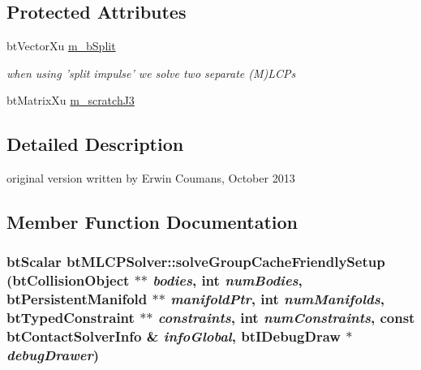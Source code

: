\subsection*{Protected Attributes}
\begin{CompactItemize}
\item 
\hypertarget{classbt_m_l_c_p_solver_9c1feb6855fa296c8ca582842f8e4fe3}{
btVectorXu \hyperlink{classbt_m_l_c_p_solver_9c1feb6855fa296c8ca582842f8e4fe3}{m\_\-bSplit}}
\label{classbt_m_l_c_p_solver_9c1feb6855fa296c8ca582842f8e4fe3}

\begin{CompactList}\small\item\em when using 'split impulse' we solve two separate (M)LCPs \item\end{CompactList}\item 
btMatrixXu \hyperlink{classbt_m_l_c_p_solver_8430698267e9572498e04e8dba3cda3b}{m\_\-scratchJ3}
\end{CompactItemize}


\subsection{Detailed Description}
original version written by Erwin Coumans, October 2013 

\subsection{Member Function Documentation}
\hypertarget{classbt_m_l_c_p_solver_a465e167537eceb89f7125d3bb2d5321}{
\subsubsection[solveGroupCacheFriendlySetup]{\setlength{\rightskip}{0pt plus 5cm}btScalar btMLCPSolver::solveGroupCacheFriendlySetup (btCollisionObject $\ast$$\ast$ {\em bodies}, \/  int {\em numBodies}, \/  btPersistentManifold $\ast$$\ast$ {\em manifoldPtr}, \/  int {\em numManifolds}, \/  btTypedConstraint $\ast$$\ast$ {\em constraints}, \/  int {\em numConstraints}, \/  const btContactSolverInfo \& {\em infoGlobal}, \/  {\bf btIDebugDraw} $\ast$ {\em debugDrawer})}}
\label{classbt_m_l_c_p_solver_a465e167537eceb89f7125d3bb2d5321}




